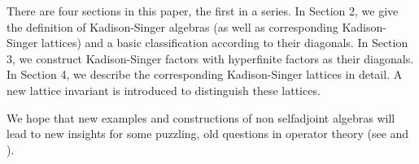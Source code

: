 There are four sections in this paper, the first in a series. In
Section 2, we give the definition of Kadison-Singer algebras (as
well as corresponding Kadison-Singer lattices) and a basic
classification according to their diagonals. In Section 3, we
construct Kadison-Singer factors with hyperfinite factors as their
diagonals. In Section 4, we describe the corresponding
Kadison-Singer lattices in detail. A new lattice invariant is
introduced to distinguish these lattices.

We hope that new examples and constructions of non selfadjoint
algebras will lead to new insights for some puzzling, old questions
in operator theory (see \cite{Ka} and \cite{RR}).
